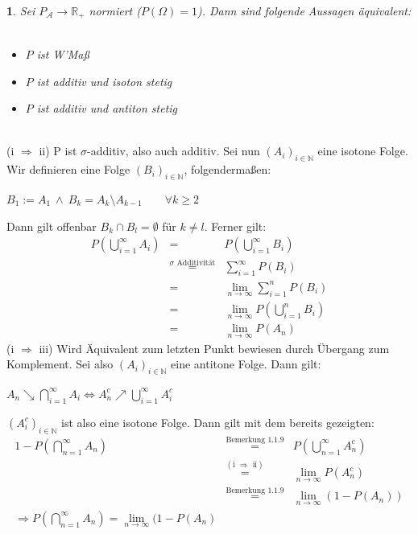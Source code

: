 \documentclass[10pt,a4paper]{report}
\numberwithin{equation}{section}
\numberwithin{figure}{section}
\theoremstyle{plain}
\theoremstyle{definition}
\theoremstyle{plain}
\newtheorem{prop}{\protect\propositionname}[section]
\theoremstyle{definition}
\theoremstyle{remark}
\theoremstyle{plain}
\theoremstyle{plain}
\theoremstyle{plain}
\theoremstyle{plain}
\theoremstyle{plain}
\providecommand{\propositionname}{Satz}
\newcommand{\1}{ \mathbb{1} } %
\begin{document}
\begin{prop}
  Sei $P_\mathcal{A}\to \mathbb{R}_+$ normiert ($P(\Omega)=1$). Dann sind folgende Aussagen äquivalent:\\\\
  \begin{itemize}
  \item[i)] $P$ ist W'Maß\\
  \item[ii)] $P$ ist additiv und isoton stetig\\
  \item[iii)] $P$ ist additiv und antiton stetig\\
  \end{itemize}
\end{prop}
\proof $ $\\
(i $\Rightarrow$ ii) P ist $\sigma$-additiv, also auch additiv. Sei nun $(A_i)_{i \in \mathbb{N}}$ eine isotone Folge. Wir definieren eine Folge $(B_i)_{i \in \mathbb{N}}$, folgendermaßen:\begin{center}
$B_1:=A_1 ~\wedge~ B_k=A_k\setminus A_{k-1} \qquad \forall k \geq 2 $
\end{center} 
Dann gilt offenbar $B_k\cap B_l=\emptyset$ für $k\neq l$. Ferner gilt:
\begin{eqnarray*}
P\left(\bigcup\limits_{i=1}^\infty A_i\right)&=&P\left(\bigcup\limits_{i=1}^\infty B_i\right)\\
&\overset{\sigma \text{ Additivität}}{=}&\sum\limits_{i=1}^\infty P(B_i)\\
&=& \lim\limits_{n \to \infty}\sum\limits_{i=1}^n P(B_i)\\ 
&=& \lim\limits_{n \to \infty} P\left(\bigcup\limits_{i=1}^n B_i\right)\\
&=& \lim\limits_{n \to \infty} P(A_n)
\end{eqnarray*}
(i $\Rightarrow$ iii) Wird Äquivalent zum letzten Punkt bewiesen durch Übergang zum Komplement. Sei also $(A_i)_{i \in \mathbb{N}}$ eine antitone Folge. Dann gilt:\begin{center}
$A_n \searrow \bigcap\limits_{i=1}^\infty A_i \Leftrightarrow A_n^c \nearrow \bigcup\limits_{i=1}^\infty A_i^c$
\end{center}
$(A_i^c)_{i \in \mathbb{N}}$ ist also eine isotone Folge. Dann gilt mit dem bereits gezeigten:
\begin{eqnarray*}
1-P\left(\bigcap\limits_{n=1}^\infty A_n\right)&\overset{\text{Bemerkung 1.1.9}}{=}&P\left(\bigcup\limits_{n=1}^\infty A_n^c\right)\\
&\overset{(\text{i } \Rightarrow \text{ ii})}{=}&\lim\limits_{n \to \infty}P(A_n^c)\\
&\overset{\text{Bemerkung 1.1.9}}{=}&\lim\limits_{n \to \infty}(1-P(A_n))\\
\Rightarrow P\left(\bigcap\limits_{n=1}^\infty A_n\right)=\lim\limits_{n \to \infty}(1-P(A_n)
\end{eqnarray*} 
\end{document}
